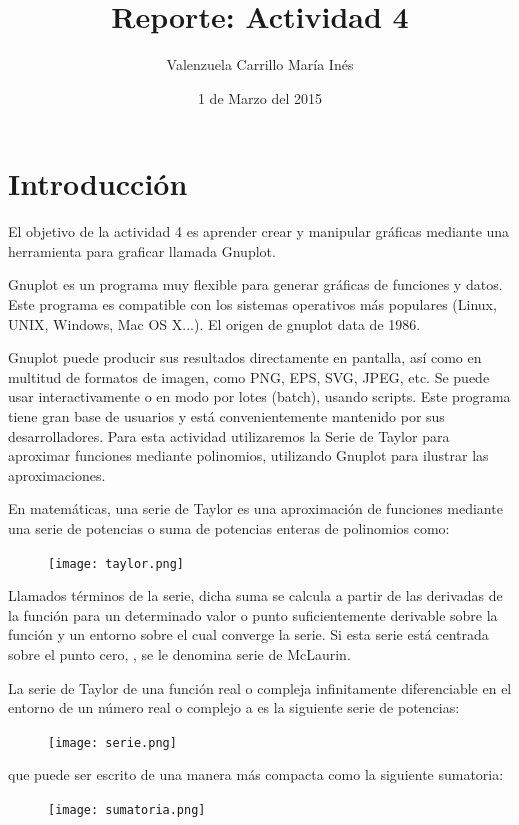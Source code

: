 \documentclass[a4paper]{article}
\title{Reporte: Actividad 4}
\author{Valenzuela Carrillo María Inés}
\date{1 de Marzo del 2015}
\begin{document}
\maketitle

\section{Introducción}

El objetivo de la actividad 4 es aprender crear y manipular gráficas mediante una herramienta para graficar llamada Gnuplot.

Gnuplot es un programa muy flexible para generar gráficas de funciones y datos. Este programa es compatible con los sistemas operativos más populares (Linux, UNIX, Windows, Mac OS X...). El origen de gnuplot data de 1986.

Gnuplot puede producir sus resultados directamente en pantalla, así como en multitud de formatos de imagen, como PNG, EPS, SVG, JPEG, etc. Se puede usar interactivamente o en modo por lotes (batch), usando scripts. Este programa tiene gran base de usuarios y está convenientemente mantenido por sus desarrolladores. 
Para esta actividad utilizaremos la Serie de Taylor para aproximar funciones mediante polinomios, utilizando Gnuplot para ilustrar las aproximaciones.

En matemáticas, una serie de Taylor es una aproximación de funciones mediante una serie de potencias o suma de potencias enteras de polinomios como:\begin{figure}[h]
\centering
\texttt{[image: taylor.png]}\end{figure}  Llamados términos de la serie, dicha suma se calcula a partir de las derivadas de la función para un determinado valor o punto  suficientemente derivable sobre la función y un entorno sobre el cual converge la serie. Si esta serie está centrada sobre el punto cero, , se le denomina serie de McLaurin.

La serie de Taylor de una función real o compleja infinitamente diferenciable en el entorno de un número real o complejo a es la siguiente serie de potencias:
\begin{figure}[h]
\centering
\texttt{[image: serie.png]}
\end{figure}



que puede ser escrito de una manera más compacta como la siguiente sumatoria:
\begin{figure}[h]
\centering
\texttt{[image: sumatoria.png]}\end{figure}
\end{document}

